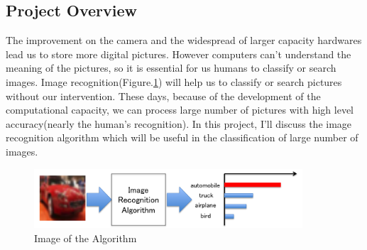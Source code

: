 \subsection{Project Overview}

The improvement on the camera and the widespread of larger capacity hardwares lead us to store more digital pictures. However computers can't understand the meaning of the pictures, so it is essential for us humans to classify or search images. Image recognition(Figure.\ref{fig:one}) will help us to classify or search pictures without our intervention. These days, because of the development of the computational capacity, we can process large number of pictures with high level accuracy(nearly the human's recognition). In this project, I'll discuss the image recognition algorithm which will be useful in the classification of large number of images.


\begin{figure}[htbp]

\begin{center}
\includegraphics[width=10cm]{picture/Image_Recognition.png}
\end{center}
\caption{Image of the Algorithm}
\label{fig:one}

\end{figure}

